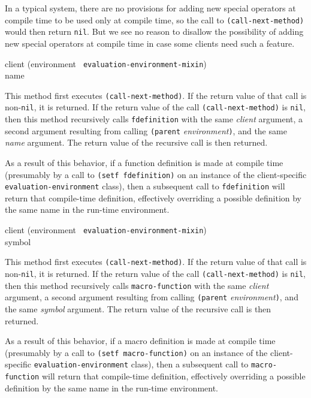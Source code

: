 In a typical system, there are no provisions for adding new special
operators at compile time to be used only at compile time, so the call
to \texttt{(call-next-method)} would then return \texttt{nil}.  But we
see no reason to disallow the possibility of adding new special
operators at compile time in case some clients need such a feature.

{\small{} {client (environment {\tt
      evaluation-environment-mixin}) \\ name}
}

This method first executes \texttt{(call-next-method)}.  If the return
value of that call is non-\texttt{nil}, it is returned.  If the return
value of the call \texttt{(call-next-method)} is \texttt{nil}, then
this method recursively calls \texttt{fdefinition} with the same
\textit{client} argument, a second argument resulting from calling
\texttt{(parent} \textit{environment}\texttt{)}, and the same
\textit{name} argument.  The return value of the recursive
call is then returned.

As a result of this behavior, if a function definition is made at
compile time (presumably by a call to \texttt{(setf fdefinition)} on
an instance of the client-specific \texttt{evaluation-environment}
class), then a subsequent call to \texttt{fdefinition} will return
that compile-time definition, effectively overriding a possible
definition by the same name in the run-time environment.

{\small{} {client (environment {\tt
      evaluation-environment-mixin}) \\ symbol}
}

This method first executes \texttt{(call-next-method)}.  If the return
value of that call is non-\texttt{nil}, it is returned.  If the return
value of the call \texttt{(call-next-method)} is \texttt{nil}, then
this method recursively calls \texttt{macro-function} with the same
\textit{client} argument, a second argument resulting from calling
\texttt{(parent} \textit{environment}\texttt{)}, and the same
\textit{symbol} argument.  The return value of the recursive
call is then returned.

As a result of this behavior, if a macro definition is made at compile
time (presumably by a call to \texttt{(setf macro-function)} on an
instance of the client-specific \texttt{evaluation-environment}
class), then a subsequent call to \texttt{macro-function} will return
that compile-time definition, effectively overriding a possible
definition by the same name in the run-time environment.

